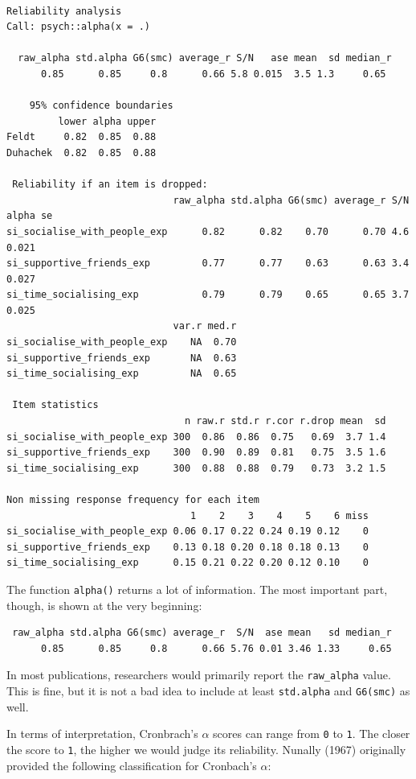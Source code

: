 \documentclass[
  letterpaper,
]{krantz}
\begin{document}
\begin{verbatim}

Reliability analysis   
Call: psych::alpha(x = .)

  raw_alpha std.alpha G6(smc) average_r S/N   ase mean  sd median_r
      0.85      0.85     0.8      0.66 5.8 0.015  3.5 1.3     0.65

    95% confidence boundaries 
         lower alpha upper
Feldt     0.82  0.85  0.88
Duhachek  0.82  0.85  0.88

 Reliability if an item is dropped:
                             raw_alpha std.alpha G6(smc) average_r S/N alpha se
si_socialise_with_people_exp      0.82      0.82    0.70      0.70 4.6    0.021
si_supportive_friends_exp         0.77      0.77    0.63      0.63 3.4    0.027
si_time_socialising_exp           0.79      0.79    0.65      0.65 3.7    0.025
                             var.r med.r
si_socialise_with_people_exp    NA  0.70
si_supportive_friends_exp       NA  0.63
si_time_socialising_exp         NA  0.65

 Item statistics 
                               n raw.r std.r r.cor r.drop mean  sd
si_socialise_with_people_exp 300  0.86  0.86  0.75   0.69  3.7 1.4
si_supportive_friends_exp    300  0.90  0.89  0.81   0.75  3.5 1.6
si_time_socialising_exp      300  0.88  0.88  0.79   0.73  3.2 1.5

Non missing response frequency for each item
                                1    2    3    4    5    6 miss
si_socialise_with_people_exp 0.06 0.17 0.22 0.24 0.19 0.12    0
si_supportive_friends_exp    0.13 0.18 0.20 0.18 0.18 0.13    0
si_time_socialising_exp      0.15 0.21 0.22 0.20 0.12 0.10    0
\end{verbatim}

The function \texttt{alpha()} returns a lot of information. The most
important part, though, is shown at the very beginning:

\begin{verbatim}
 raw_alpha std.alpha G6(smc) average_r  S/N  ase mean   sd median_r
      0.85      0.85     0.8      0.66 5.76 0.01 3.46 1.33     0.65
\end{verbatim}

In most publications, researchers would primarily report the
\texttt{raw\_alpha} value. This is fine, but it is not a bad idea to
include at least \texttt{std.alpha} and \texttt{G6(smc)} as well.

In terms of interpretation, Cronbrach's \(\alpha\) scores can range from
\texttt{0} to \texttt{1}. The closer the score to \texttt{1}, the higher
we would judge its reliability. Nunally (1967) originally provided the
following classification for Cronbach's \(\alpha\):
\end{document}
